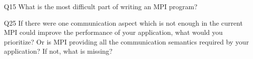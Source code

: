 \begin{description}%
\item{Q15} What is the most difficult part of writing an MPI program?%
\item{Q25} If there were one communication aspect which is not enough in the current MPI could improve the performance of your application, what would you prioritize? Or is MPI providing all the communication semantics required by your application? If not, what is missing?%
\end{description}%
